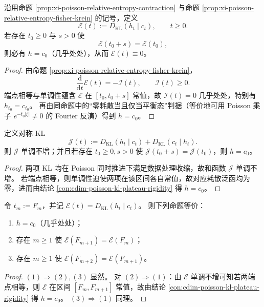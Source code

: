 \begin{conclusion}\label{con:cdim-poisson-kl-plateau-rigidity}
沿用命题 \ref{prop:xi-poisson-relative-entropy-contraction} 与命题 \ref{prop:xi-poisson-relative-entropy-fisher-krein} 的记号，定义
\[
\mathcal E(t):=D_{\mathrm{KL}}(h_t\mid c_t),\qquad t\ge 0.
\]
若存在 \(t_0\ge 0\) 与 \(s>0\) 使
\[
\mathcal E(t_0+s)=\mathcal E(t_0),
\]
则必有 \(h=c_0\)（几乎处处），从而 \(\mathcal E(t)\equiv 0\)。
\end{conclusion}
\begin{proof}
由命题 \ref{prop:xi-poisson-relative-entropy-fisher-krein}，
\[
\frac{\mathrm d}{\mathrm dt}\mathcal E(t)=-\mathcal I(t),\qquad \mathcal I(t)\ge 0.
\]
端点相等与单调性蕴含 \(\mathcal E\) 在 \([t_0,t_0+s]\) 常值，故 \(\mathcal I(t)=0\) 几乎处处，特别有 \(h_{t_0}=c_{t_0}\)。
再由同命题中的“零耗散当且仅当平衡态”判据（等价地可用 Poisson 乘子 \(e^{-t_0|\xi|}\neq 0\) 的 Fourier 反演）得到 \(h=c_0\)。
\end{proof}

\begin{conclusion}[对称 KL 的严格耗散与双侧平台唯一性]\label{con:cdim-poisson-jeffreys-dissipation-rigidity}
定义对称 KL
\[
\mathcal J(t):=D_{\mathrm{KL}}(h_t\mid c_t)+D_{\mathrm{KL}}(c_t\mid h_t).
\]
则 \(\mathcal J\) 单调不增；并且若存在 \(t_0\ge 0,s>0\) 使 \(\mathcal J(t_0+s)=\mathcal J(t_0)\)，则 \(h=c_0\)。
\end{conclusion}
\begin{proof}
两项 KL 均在 Poisson 同时推进下满足数据处理收缩，故和函数 \(\mathcal J\) 单调不增。
若端点相等，则单调性迫使两项在该区间各自常值，故对应耗散泛函均为零，进而由结论 \ref{con:cdim-poisson-kl-plateau-rigidity} 得 \(h=c_0\)。
\end{proof}

\begin{conclusion}\label{con:cdim-fibonacci-kl-platform-finite-certificate}
令 \(t_m:=F_m\)，并记 \(\mathcal E(t)=D_{\mathrm{KL}}(h_t\mid c_t)\)。
则下列命题等价：
\begin{enumerate}
  \item \(h=c_0\)（几乎处处）；
  \item 存在 \(m\ge 1\) 使 \(\mathcal E(F_{m+1})=\mathcal E(F_m)\)；
  \item 存在 \(m\ge 1\) 使 \(\mathcal E(F_{m+2})=\mathcal E(F_{m+1})\)。
\end{enumerate}
\end{conclusion}
\begin{proof}
\((1)\Rightarrow(2),(3)\) 显然。
对 \((2)\Rightarrow(1)\)：由 \(\mathcal E\) 单调不增可知若两端点相等，则 \(\mathcal E\) 在区间 \([F_m,F_{m+1}]\) 常值，故由结论 \ref{con:cdim-poisson-kl-plateau-rigidity} 得 \(h=c_0\)。
\((3)\Rightarrow(1)\) 同理。
\end{proof}

